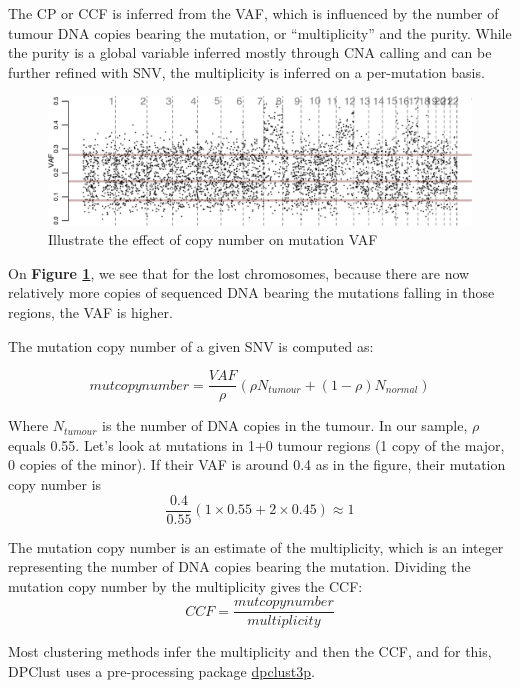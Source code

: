 \documentclass[]{article}
\begin{document}
The CP or CCF is inferred from the VAF, which is influenced by the
number of tumour DNA copies bearing the mutation, or ``multiplicity''
and the purity. While the purity is a global variable inferred mostly
through CNA calling and can be further refined with SNV, the
multiplicity is inferred on a per-mutation basis.

\begin{figure}

{\centering \includegraphics{src_guide_files/figure-latex/fig6-1} 

}

\caption{\label{fig6} Illustrate the effect of copy number on mutation VAF}\label{fig:fig6}
\end{figure}

On \textbf{Figure \ref{fig:fig6}}, we see that for the lost chromosomes,
because there are now relatively more copies of sequenced DNA bearing
the mutations falling in those regions, the VAF is higher.

The mutation copy number of a given SNV is computed as:

\[ mutcopynumber=\frac{VAF}{\rho}(\rho N_{tumour} + (1-\rho) N_{normal})\]

Where \(N_{tumour}\) is the number of DNA copies in the tumour. In our
sample, \(\rho\) equals 0.55. Let's look at mutations in 1+0 tumour
regions (1 copy of the major, 0 copies of the minor). If their VAF is
around 0.4 as in the figure, their mutation copy number is
\[\frac{0.4}{0.55}(1 \times 0.55+2 \times 0.45) \approx 1\]

The mutation copy number is an estimate of the multiplicity, which is an
integer representing the number of DNA copies bearing the mutation.
Dividing the mutation copy number by the multiplicity gives the CCF:
\[CCF=\frac{mutcopynumber}{multiplicity}\]

Most clustering methods infer the multiplicity and then the CCF, and for
this, DPClust uses a pre-processing package
\href{https://github.com/Wedge-Oxford/dpclust_smchet_docker/blob/master/dpclust3p_v1.0.6.tar.gz}{dpclust3p}.
\end{document}

